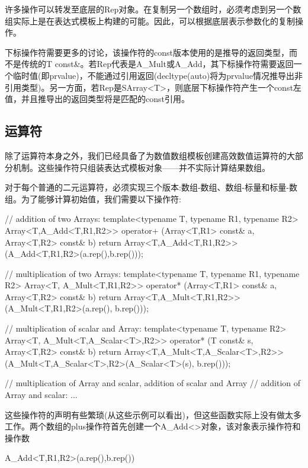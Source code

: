 许多操作可以转发至底层的Rep对象。在复制另一个数组时，必须考虑到另一个数组实际上是在表达式模板上构建的可能。因此，可以根据底层表示参数化的复制操作。

下标操作符需要更多的讨论，该操作符的const版本使用的是推导的返回类型，而不是传统的T const\&。若Rep代表是A\_Mult或A\_Add，其下标操作符需要返回一个临时值(即prvalue)，不能通过引用返回(decltype(auto)将为prvalue情况推导出非引用类型)。另一方面，若Rep是SArray<T>，则底层下标操作符产生一个const左值，并且推导出的返回类型将是匹配的const引用。

\subsection{运算符}

除了运算符本身之外，我们已经具备了为数值数组模板创建高效数值运算符的大部分机制。这些操作符只组装表达式模板对象——并不实际计算结果数组。

对于每个普通的二元运算符，必须实现三个版本:数组-数组、数组-标量和标量-数组。为了能够计算初始值，我们需要以下操作符:

\begin{cpp}
// addition of two Arrays:
template<typename T, typename R1, typename R2>
Array<T,A_Add<T,R1,R2>>
operator+ (Array<T,R1> const& a, Array<T,R2> const& b) {
	return Array<T,A_Add<T,R1,R2>>
		(A_Add<T,R1,R2>(a.rep(),b.rep()));
}

// multiplication of two Arrays:
template<typename T, typename R1, typename R2>
Array<T, A_Mult<T,R1,R2>>
operator* (Array<T,R1> const& a, Array<T,R2> const& b) {
	return Array<T,A_Mult<T,R1,R2>>
		(A_Mult<T,R1,R2>(a.rep(), b.rep()));
}

// multiplication of scalar and Array:
template<typename T, typename R2>
Array<T, A_Mult<T,A_Scalar<T>,R2>>
operator* (T const& s, Array<T,R2> const& b) {
	return Array<T,A_Mult<T,A_Scalar<T>,R2>>
		(A_Mult<T,A_Scalar<T>,R2>(A_Scalar<T>(s), b.rep()));
}

// multiplication of Array and scalar, addition of scalar and Array
// addition of Array and scalar:
...
\end{cpp}

这些操作符的声明有些繁琐(从这些示例可以看出)，但这些函数实际上没有做太多工作。两个数组的plus操作符首先创建一个A\_Add<>对象，该对象表示操作符和操作数

\begin{cpp}
A_Add<T,R1,R2>(a.rep(),b.rep())
\end{cpp}

